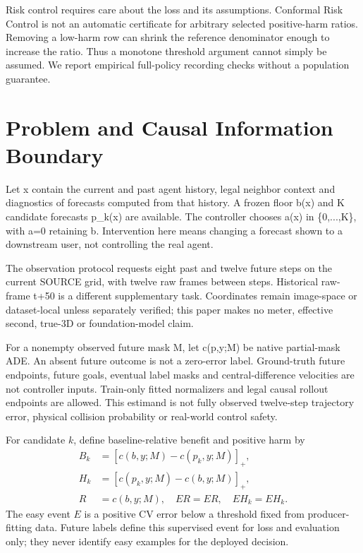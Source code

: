 \documentclass[10pt,twocolumn,letterpaper]{article}
\begin{document}
Risk control requires care about the loss and its assumptions. Conformal Risk
Control \cite{ref5} is not an automatic certificate for arbitrary selected positive-harm
ratios. Removing a low-harm row can shrink the reference denominator enough to
increase the ratio. Thus a monotone threshold argument cannot simply be assumed.
We report empirical full-policy recording checks without a population guarantee.

\section{Problem and Causal Information Boundary}
Let x contain the current and past agent history, legal neighbor context and
diagnostics of forecasts computed from that history. A frozen floor b(x) and
K candidate forecasts p\_k(x) are available. The controller chooses a(x) in
\{0,...,K\}, with a=0 retaining b. Intervention here means changing a forecast
shown to a downstream user, not controlling the real agent.

The observation protocol requests eight past and twelve future steps on the
current SOURCE grid, with twelve raw frames between steps. Historical raw-frame
t+50 is a different supplementary task. Coordinates remain image-space or
dataset-local unless separately verified; this paper makes no meter, effective
second, true-3D or foundation-model claim.

For a nonempty observed future mask M, let c(p,y;M) be native partial-mask ADE.
An absent future outcome is not a zero-error label. Ground-truth future
endpoints, future goals, eventual label masks and central-difference velocities
are not controller inputs. Train-only fitted normalizers and legal causal
rollout endpoints are allowed. This estimand is not fully observed twelve-step
trajectory error, physical collision probability or real-world control safety.

For candidate $k$, define baseline-relative benefit and positive harm by
\begin{align}
B_k&=[c(b,y;M)-c(p_k,y;M)]_+,\\
H_k&=[c(p_k,y;M)-c(b,y;M)]_+,\\
R&=c(b,y;M),\quad ER=E R,\quad EH_k=E H_k.
\end{align}
The easy event $E$ is a positive CV error below a threshold fixed from producer-fitting data.
Future labels define this supervised event for loss and evaluation only; they never identify easy examples for the deployed decision.
\end{document}
